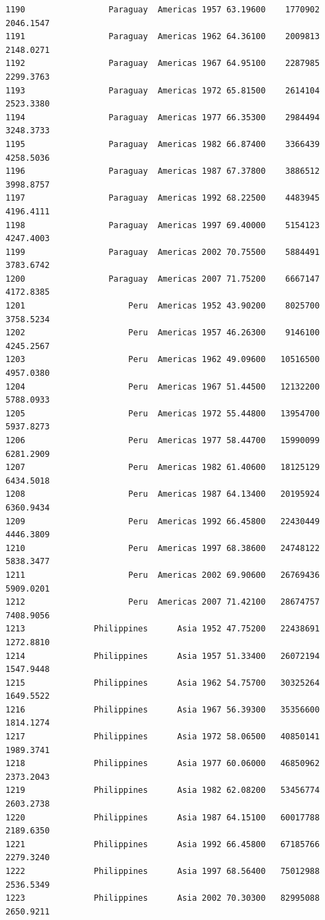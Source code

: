 \documentclass[
  letterpaper,
  DIV=11,
  numbers=noendperiod]{scrreprt}
\begin{document}
\begin{verbatim}
1190                 Paraguay  Americas 1957 63.19600    1770902   2046.1547
1191                 Paraguay  Americas 1962 64.36100    2009813   2148.0271
1192                 Paraguay  Americas 1967 64.95100    2287985   2299.3763
1193                 Paraguay  Americas 1972 65.81500    2614104   2523.3380
1194                 Paraguay  Americas 1977 66.35300    2984494   3248.3733
1195                 Paraguay  Americas 1982 66.87400    3366439   4258.5036
1196                 Paraguay  Americas 1987 67.37800    3886512   3998.8757
1197                 Paraguay  Americas 1992 68.22500    4483945   4196.4111
1198                 Paraguay  Americas 1997 69.40000    5154123   4247.4003
1199                 Paraguay  Americas 2002 70.75500    5884491   3783.6742
1200                 Paraguay  Americas 2007 71.75200    6667147   4172.8385
1201                     Peru  Americas 1952 43.90200    8025700   3758.5234
1202                     Peru  Americas 1957 46.26300    9146100   4245.2567
1203                     Peru  Americas 1962 49.09600   10516500   4957.0380
1204                     Peru  Americas 1967 51.44500   12132200   5788.0933
1205                     Peru  Americas 1972 55.44800   13954700   5937.8273
1206                     Peru  Americas 1977 58.44700   15990099   6281.2909
1207                     Peru  Americas 1982 61.40600   18125129   6434.5018
1208                     Peru  Americas 1987 64.13400   20195924   6360.9434
1209                     Peru  Americas 1992 66.45800   22430449   4446.3809
1210                     Peru  Americas 1997 68.38600   24748122   5838.3477
1211                     Peru  Americas 2002 69.90600   26769436   5909.0201
1212                     Peru  Americas 2007 71.42100   28674757   7408.9056
1213              Philippines      Asia 1952 47.75200   22438691   1272.8810
1214              Philippines      Asia 1957 51.33400   26072194   1547.9448
1215              Philippines      Asia 1962 54.75700   30325264   1649.5522
1216              Philippines      Asia 1967 56.39300   35356600   1814.1274
1217              Philippines      Asia 1972 58.06500   40850141   1989.3741
1218              Philippines      Asia 1977 60.06000   46850962   2373.2043
1219              Philippines      Asia 1982 62.08200   53456774   2603.2738
1220              Philippines      Asia 1987 64.15100   60017788   2189.6350
1221              Philippines      Asia 1992 66.45800   67185766   2279.3240
1222              Philippines      Asia 1997 68.56400   75012988   2536.5349
1223              Philippines      Asia 2002 70.30300   82995088   2650.9211

\end{verbatim}
\end{document}
